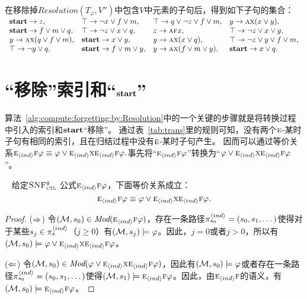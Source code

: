 \begin{example}\label{examp:remA}
	在移除掉$Resolution(T_{\varphi}, V'')$中包含$V$中元素的子句后，得到如下子句的集合：\\
	$
	\begin{array}{llll}
		\textbf{start}\rightarrow z, & 
		\top \rightarrow \neg x\vee f \vee m, &
		\top \rightarrow q \vee \neg z \vee f \vee m, &
		y \rightarrow \textsc{a} \textsc{x}(x\vee y), \\ 
		\textbf{start} \rightarrow f\vee m \vee q,  & 
		\top \rightarrow \neg z \vee x \vee q, &
		z \rightarrow \textsc{a} \textsc{f} x, &  
		\top \rightarrow \neg z \vee x \vee y, \\
		y \rightarrow \textsc{a}\textsc{x}(q \vee f\vee m), &
		\textbf{start} \rightarrow x \vee y, &
		y \rightarrow \textsc{a}\textsc{x}(x\vee q), &
		\top \rightarrow \neg z \vee y \vee f \vee m,\\
		\top \rightarrow \neg y \vee q,  & 
		\textbf{start} \rightarrow f\vee m \vee y, &
		y \rightarrow \textsc{a}\textsc{x}(f\vee m\vee y), &
		\textbf{start} \rightarrow x \vee q.
	\end{array}
	$
\end{example}

\section{“移除”索引和“$\textbf{start}$”}
算法~\ref{alg:compute:forgetting:by:Resolution}中的一个关键的步骤就是将转换过程中引入的索引和$\textbf{start}$“移除”。
通过表~\ref{tab:trans}里的规则可知，没有两个$\textsc{e}$-某时子句有相同的索引，且在归结过程中没有$\textsc{e}$-某时子句产生。
因而可以通过等价关系$\textsc{e}_{{\langle{ind}\rangle}} \textsc{f} \varphi \equiv \varphi \vee \textsc{e}_{{\langle{ind}\rangle}} \textsc{x} \textsc{e}_{{\langle{ind}\rangle}}\textsc{f} \varphi.$事先将“$\textsc{e}_{{\langle{ind}\rangle}} \textsc{f} \varphi$”转换为“$\varphi \vee \textsc{e}_{{\langle{ind}\rangle}} \textsc{x} \textsc{e}_{{\langle{ind}\rangle}}\textsc{f} \varphi$”。


\begin{lemma}~\label{lem:Ind:EF}
	给定${\textsc{SNF}_{\textsc{ctl}}^g}$ 公式$\textsc{e}_{{\langle{ind}\rangle}} \textsc{f} \varphi$，下面等价关系成立：
	\[
	\textsc{e}_{{\langle{ind}\rangle}} \textsc{f} \varphi \equiv \varphi \vee \textsc{e}_{{\langle{ind}\rangle}} \textsc{x} \textsc{e}_{{\langle{ind}\rangle}}\textsc{f} \varphi.
	\]
\end{lemma}

\begin{proof}
	($\Rightarrow$) 令$({\cal M}, s_0) \in \textit{Mod}(\textsc{e}_{{\langle{ind}\rangle}} \textsc{f} \varphi)$，存在一条路径$\pi_{s_0}^{{\langle{ind}\rangle}} = (s_0, s_1, \dots)$使得对于某些$s_j \in \pi_s^{{\langle{ind}\rangle}}$（$j \ge 0$）有$({\cal M}, s_j) \models \varphi$。因此，$j=0$或者$j > 0$，所以有$({\cal M}, s_0) \models  \varphi \vee \textsc{e}_{{\langle{ind}\rangle}} \textsc{x} \textsc{e}_{{\langle{ind}\rangle}}\textsc{f} \varphi$。
	
	($\Leftarrow$) 令$({\cal M}, s_0) \in \textit{Mod}(\varphi \vee \textsc{e}_{{\langle{ind}\rangle}} \textsc{x} \textsc{e}_{{\langle{ind}\rangle}}\textsc{f} \varphi)$，因此有$({\cal M},s_0) \models \varphi$或者存在一条路径$\pi_{s_0}^{{\langle{ind}\rangle}} = (s_0, s_1, \dots)$使得$({\cal M}, s_1) \models \textsc{e}_{{\langle{ind}\rangle}}\textsc{f} \varphi$。因此，由$\textsc{e}_{{\langle{ind}\rangle}}\textsc{f}$的语义，有$({\cal M}, s_0) \models \textsc{e}_{{\langle{ind}\rangle}} \textsc{f} \varphi$。
\end{proof}


